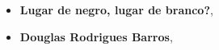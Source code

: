 \begin{itemize}


\item \textbf{Lugar de negro, lugar de branco?}, \lipsum[1]
  
\item \textbf{Douglas Rodrigues Barros}, \lipsum[2] 

\end{itemize}

